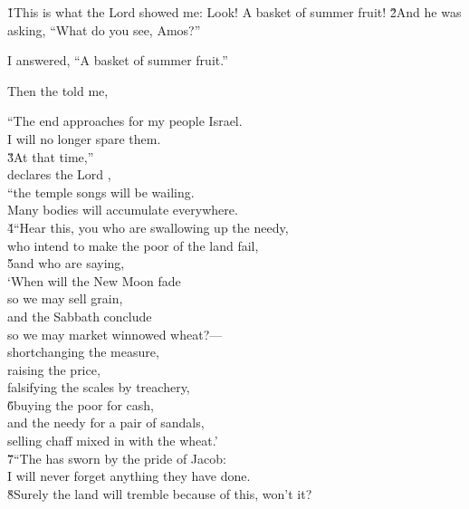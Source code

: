 \v{1}This is what the Lord  showed me: Look! A basket of summer fruit! \v{2}And he was asking, ``What do you see, Amos?''

I answered, ``A basket of summer fruit.''

Then the  told me,

\begin{poetry}
\poeml ``The end approaches for my people Israel. \\
\poemll    I will no longer spare them. \\
\poeml \v{3}At that time,'' \\
\poemll    declares the Lord , \\
\poeml ``the temple songs will be wailing. \\
\poemll    Many bodies will accumulate everywhere. \\
\poeml \v{4}``Hear this, you who are swallowing up the needy, \\
\poemll    who intend to make the poor of the land fail, \\
\poeml \v{5}and who are saying, \\
\poemll    `When will the New Moon fade \\
\poemlll       so we may sell grain, \\
\poemll    and the Sabbath conclude \\
\poemlll       so we may market winnowed wheat?--- \\
\poeml shortchanging the measure, \\
\poemll    raising the price, \\
\poemlll       falsifying the scales by treachery, \\
\poeml \v{6}buying the poor for cash, \\
\poemll    and the needy for a pair of sandals, \\
\poemlll       selling chaff mixed in with the wheat.' \\
\poeml \v{7}``The  has sworn by the pride of Jacob: \\
\poemll    I will never forget anything they have done. \\
\poeml \v{8}Surely the land will tremble because of this, won't it? \\

\end{poetry}
